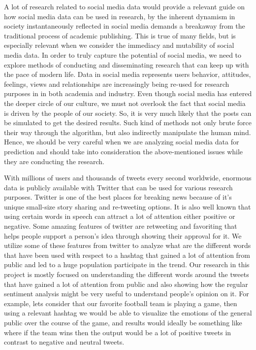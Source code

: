 A lot of research related to social media data would provide a relevant guide on how 
social media data can be used in research, by the inherent dynamism in society 
instantaneously reflected in social media demands a breakaway from the traditional 
process of academic publishing. This is true of many fields, but is 
especially relevant when we consider the immediacy and mutability of 
social media data. In order to truly capture the potential of social 
media, we need to explore methods of conducting and disseminating 
research that can keep up with the pace of modern life. Data in social media 
represents users behavior, attitudes, feelings, views and relationships are
increasingly being re-used for research purposes in in both academia and industry. 
Even though social media has entered the deeper circle of our culture, we must 
not overlook the fact that social media is driven by the people of our society. 
So, it is very much likely that the posts can be simulated to get the desired 
results. Such kind of methods not only brute force their way through the 
algorithm, but also indirectly manipulate the human mind. Hence, we
should be very careful when we are analyzing social media data for prediction 
and should take into consideration the above-mentioned issues while they are 
conducting the research.

With millions of users and thousands of tweets every second worldwide, enormous 
data is publicly available with Twitter that can be used for 
various research purposes. Twitter is one of the best places for breaking news 
because of it’s unique small-size story sharing and re-tweeting options. 
It is also well known that using certain words in speech can attract a lot of attention 
either positive or negative. Some amazing features of twitter are retweeting and 
favoriting that helps people support a person’s idea through showing their 
approval for it. We utilize some of these features from twitter to analyze what are the 
different words that have been used with respect to a hashtag that gained a lot of 
attention from public and led to a huge population participate in the trend. 
Our research in this project is mostly focused on understanding the different 
words around the tweets that have gained a lot of attention from public and also 
showing how the regular sentiment analysis might be very useful to understand 
people’s opinion on it. For example, lets consider that our favorite 
football team is playing a game, then using a relevant hashtag we would be able 
to visualize the emotions of the general public over the course of the game, and 
results would ideally be something like where if the team wins then the output 
would be a lot of positive tweets in contrast to negative and neutral tweets. 



